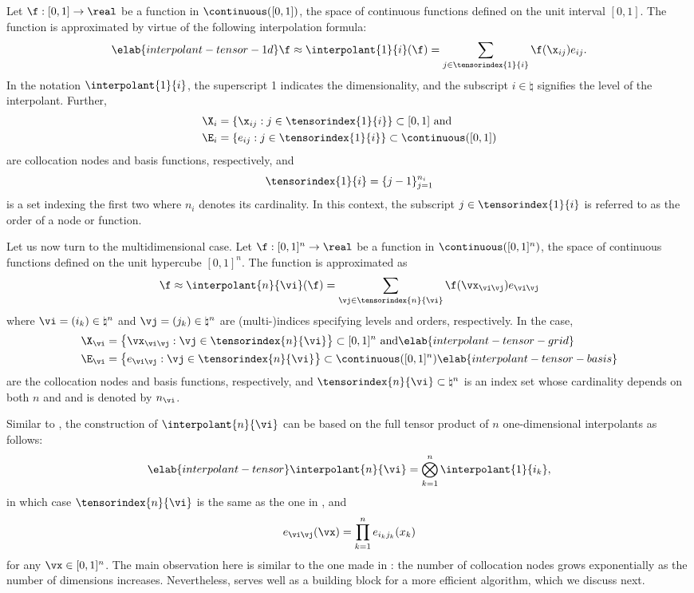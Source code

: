 Let $\f: [0, 1] \to \real$ be a function in $\continuous([0, 1])$, the space of
continuous functions defined on the unit interval $[0, 1]$. The function is
approximated by virtue of the following interpolation formula:
\begin{equation} \elab{interpolant-tensor-1d}
  \f \approx \interpolant{1}{i}(\f)
  = \sum_{j \in \tensorindex{1}{i}} \f(\x_{ij}) e_{ij}.
\end{equation}
In the notation $\interpolant{1}{i}$, the superscript 1 indicates the
dimensionality, and the subscript $i \in \natural$ signifies the level of the
interpolant. Further,
\begin{align*}
  & \X_i = \{ \x_{ij}: j \in \tensorindex{1}{i} \} \subset [0, 1] \text{ and} \\
  & \E_i = \{ e_{ij}: j \in \tensorindex{1}{i} \} \subset \continuous([0, 1])
\end{align*}
are collocation nodes and basis functions, respectively, and
\[
  \tensorindex{1}{i} = \{ j - 1 \}_{j = 1}^{n_i}
\]
is a set indexing the first two where $n_i$ denotes its cardinality. In this
context, the subscript $j \in \tensorindex{1}{i}$ is referred to as the order of
a node or function.

Let us now turn to the multidimensional case. Let $\f: [0, 1]^n \to \real$ be a
function in $\continuous([0, 1]^n)$, the space of continuous functions defined
on the unit hypercube $[0, 1]^n$. The function is approximated as
\[
  \f \approx \interpolant{n}{\vi}(\f)
  = \sum_{\vj \in \tensorindex{n}{\vi}} \f(\vx_{\vi \vj}) e_{\vi \vj}
\]
where $\vi = (i_k) \in \natural^n$ and $\vj = (j_k) \in \natural^n$ are
(multi-)indices specifying levels and orders, respectively. In the case,
\begin{align}
  & \X_{\vi} = \left\{ \vx_{\vi \vj}: \vj \in \tensorindex{n}{\vi} \right\} \subset [0, 1]^n \text{ and} \elab{interpolant-tensor-grid} \\
  & \E_{\vi} = \left\{ e_{\vi \vj}: \vj \in \tensorindex{n}{\vi} \right\} \subset \continuous([0, 1]^n) \elab{interpolant-tensor-basis}
\end{align}
are the collocation nodes and basis functions, respectively, and
$\tensorindex{n}{\vi} \subset \natural^n$ is an index set whose cardinality
depends on both $n$ and \vi and is denoted by $n_{\vi}$.

Similar to , the construction of $\interpolant{n}{\vi}$
can be based on the full tensor product of $n$ one-dimensional interpolants as
follows:
\begin{equation} \elab{interpolant-tensor}
  \interpolant{n}{\vi} = \bigotimes_{k = 1}^n \interpolant{1}{i_k},
\end{equation}
in which case $\tensorindex{n}{\vi}$ is the same as the one in
, and
\[
  e_{\vi \vj}(\vx) = \prod_{k = 1}^n e_{i_k j_k}(x_k)
\]
for any $\vx \in [0, 1]^n$. The main observation here is similar to the one made
in : the number of collocation nodes grows
exponentially as the number of dimensions increases. Nevertheless,
 serves well as a building block for a more efficient
algorithm, which we discuss next.

